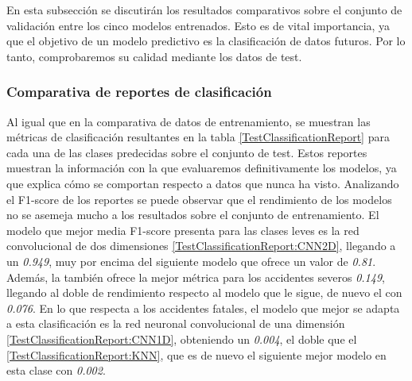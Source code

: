   En esta subsección se discutirán los resultados comparativos sobre el conjunto de validación entre los cinco modelos entrenados. Esto es de vital importancia, ya que el objetivo de un modelo predictivo es la clasificación de datos futuros. Por lo tanto, comprobaremos su calidad mediante los datos de test.

  \subsubsection{Comparativa de reportes de clasificación}

    Al igual que en la comparativa de datos de entrenamiento, se muestran las métricas de clasificación resultantes en la tabla \eqref{TestClassificationReport} para cada una de las clases predecidas sobre el  conjunto de test. Estos reportes muestran la información con la que evaluaremos definitivamente los modelos, ya que explica cómo se comportan respecto a datos que nunca ha visto. Analizando el F1-score de los reportes se puede observar que el rendimiento de los modelos no se asemeja mucho a los resultados sobre el conjunto de entrenamiento. El modelo que mejor media F1-score presenta para las clases leves es la red convolucional de dos dimensiones \eqref{TestClassificationReport:CNN2D}, llegando a un \textit{0.949}, muy por encima del siguiente modelo  que ofrece un valor de \textit{0.81}. Además, la  también ofrece la mejor métrica para los accidentes severos \textit{0.149}, llegando al doble de rendimiento respecto al modelo que le sigue, de nuevo el  con \textit{0.076}. En lo que respecta a los accidentes fatales, el modelo que mejor se adapta a esta clasificación es la red neuronal convolucional de una dimensión \eqref{TestClassificationReport:CNN1D}, obteniendo un \textit{0.004}, el doble que el  \eqref{TestClassificationReport:KNN}, que es de nuevo el siguiente mejor modelo en esta clase con \textit{0.002}.


